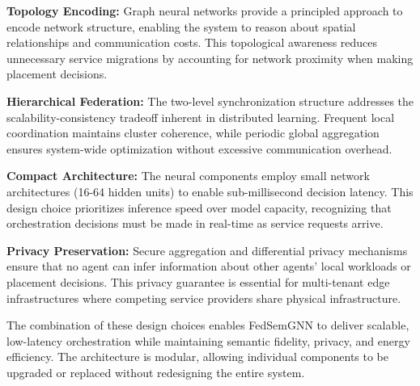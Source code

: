 \textbf{Topology Encoding:} Graph neural networks provide a principled approach to encode network structure, enabling the system to reason about spatial relationships and communication costs. This topological awareness reduces unnecessary service migrations by accounting for network proximity when making placement decisions.

\textbf{Hierarchical Federation:} The two-level synchronization structure addresses the scalability-consistency tradeoff inherent in distributed learning. Frequent local coordination maintains cluster coherence, while periodic global aggregation ensures system-wide optimization without excessive communication overhead.

\textbf{Compact Architecture:} The neural components employ small network architectures (16-64 hidden units) to enable sub-millisecond decision latency. This design choice prioritizes inference speed over model capacity, recognizing that orchestration decisions must be made in real-time as service requests arrive.

\textbf{Privacy Preservation:} Secure aggregation and differential privacy mechanisms ensure that no agent can infer information about other agents' local workloads or placement decisions. This privacy guarantee is essential for multi-tenant edge infrastructures where competing service providers share physical infrastructure.

The combination of these design choices enables FedSemGNN to deliver scalable, low-latency orchestration while maintaining semantic fidelity, privacy, and energy efficiency. The architecture is modular, allowing individual components to be upgraded or replaced without redesigning the entire system.

